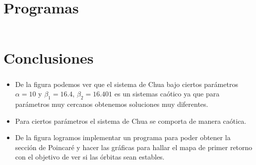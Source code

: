 \section{Programas}

\begin{frame}[fragile]
	\frametitle{\secname}
	\begin{minipage}{0.45\textwidth}
	\end{minipage}
	\begin{minipage}{0.45\textwidth}
		\inputminted[fontsize=\tiny, highlightlines={13-16,28-30,33-38}, firstline=1, lastline=41]{python}{poincare_chua.py}
	\end{minipage}
\end{frame}


\section{Conclusiones}

\begin{frame}
	\frametitle{\secname}
	\begin{itemize}
		\item De la figura podemos ver que el sistema de Chua bajo ciertos parámetros $\alpha= 10$  y $\beta_{1}=16.4$, $\beta_{2}=16.401$ es un sistemas caótico ya que para parámetros muy cercanos obtenemos soluciones muy diferentes.
		\item Para ciertos parámetros el sistema de Chua se comporta de manera caótica.
		\item De la figura logramos implementar un programa para poder obtener la sección de Poincaré y hacer las gráficas para hallar el mapa de primer retorno con el objetivo de ver si las órbitas sean estables. %
	\end{itemize}
\end{frame}
